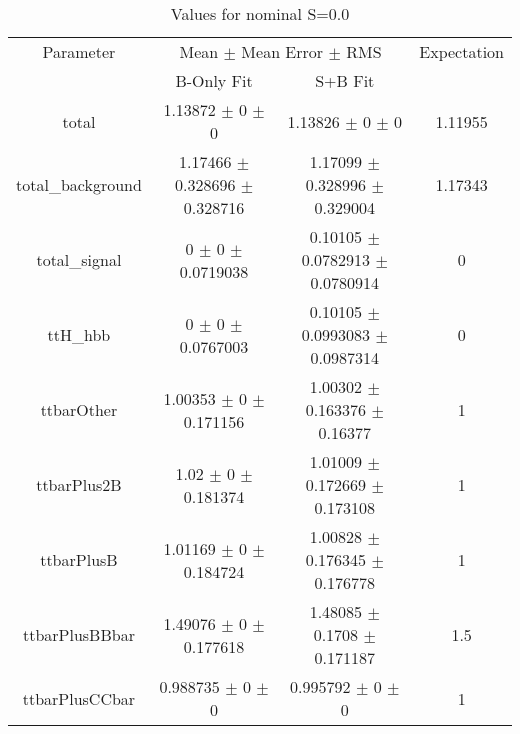 \begin{table}
\centering
\caption{Values for nominal S=0.0}
\begin{tabular}{cccc}
\toprule
Parameter & \multicolumn{2}{c}{Mean $\pm$ Mean Error $\pm$ RMS} & Expectation\\
 & B-Only Fit & S+B Fit & \\
\midrule
total & \num{1.13872} $\pm$ \num{0} $\pm$ \num{0} & \num{1.13826} $\pm$ \num{0} $\pm$ \num{0} & \num{1.11955}\\
total\_background & \num{1.17466} $\pm$ \num{0.328696} $\pm$ \num{0.328716} & \num{1.17099} $\pm$ \num{0.328996} $\pm$ \num{0.329004} & \num{1.17343}\\
total\_signal & \num{0} $\pm$ \num{0} $\pm$ \num{0.0719038} & \num{0.10105} $\pm$ \num{0.0782913} $\pm$ \num{0.0780914} & \num{0}\\
ttH\_hbb & \num{0} $\pm$ \num{0} $\pm$ \num{0.0767003} & \num{0.10105} $\pm$ \num{0.0993083} $\pm$ \num{0.0987314} & \num{0}\\
ttbarOther & \num{1.00353} $\pm$ \num{0} $\pm$ \num{0.171156} & \num{1.00302} $\pm$ \num{0.163376} $\pm$ \num{0.16377} & \num{1}\\
ttbarPlus2B & \num{1.02} $\pm$ \num{0} $\pm$ \num{0.181374} & \num{1.01009} $\pm$ \num{0.172669} $\pm$ \num{0.173108} & \num{1}\\
ttbarPlusB & \num{1.01169} $\pm$ \num{0} $\pm$ \num{0.184724} & \num{1.00828} $\pm$ \num{0.176345} $\pm$ \num{0.176778} & \num{1}\\
ttbarPlusBBbar & \num{1.49076} $\pm$ \num{0} $\pm$ \num{0.177618} & \num{1.48085} $\pm$ \num{0.1708} $\pm$ \num{0.171187} & \num{1.5}\\
ttbarPlusCCbar & \num{0.988735} $\pm$ \num{0} $\pm$ \num{0} & \num{0.995792} $\pm$ \num{0} $\pm$ \num{0} & \num{1}\\
\bottomrule
\end{tabular}
\end{table}